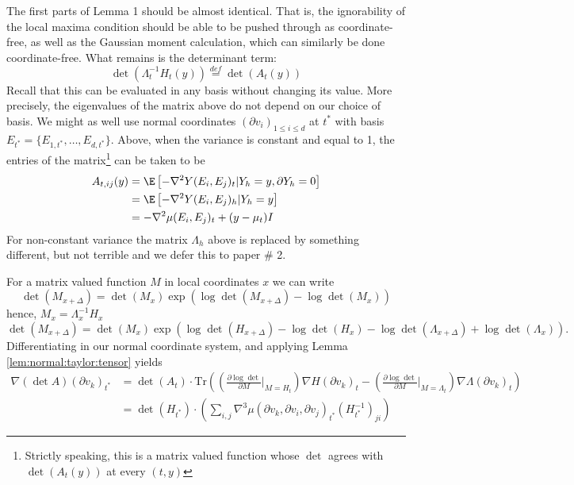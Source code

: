 \documentclass{article}
\begin{document}
The first parts of Lemma 1 should be almost identical. That is, the ignorability
of the local maxima condition should be able to be pushed through as coordinate-free,
as well as the Gaussian moment calculation, which can similarly be done coordinate-free. What remains is the determinant term:
$$
\det(\Lambda_t^{-1} H_t(y)) \overset{def}{=} \det(A_t(y))
$$
Recall that this can be evaluated in any basis without changing its value. More precisely, the eigenvalues
of the matrix above do not depend on our choice of basis.
We might as well use normal coordinates $(\partial v_i)_{1 \leq i \leq d}$ at $t^*$ with basis $E_{t^*}=\{E_{1,t^*}, \dots, E_{d,t^*}\}$.
Above, when the variance is constant and equal to 1, the entries of the matrix\footnote{Strictly speaking, this is a matrix valued function whose $\det$ agrees with $\det(A_t(y))$ at every $(t,y)$} can be taken to be
$$
\begin{aligned}
A_{t,ij}(y) &= \E \left[-\nabla^2 Y(E_i, E_j)_t | Y_h=y, \partial Y_h=0\right] \\
&= \E \left[-\nabla^2 Y(E_i, E_j)_h | Y_h=y\right] \\
&= - \nabla^2 \mu(E_i, E_j)_t + (y - \mu_t) I \\
\end{aligned}
$$
For non-constant variance the matrix $\Lambda_h$ above is replaced by something different, but not terrible and we defer this to paper \# 2.

For a matrix valued function $M$ in local coordinates $x$ we can write
$$
\det(M_{x+\Delta}) = \det(M_{x}) \exp(\log \det(M_{x+\Delta}) - \log \det( M_{x}))
$$
hence, $M_x = \Lambda_x^{-1}H_x$
$$
\det(M_{x+\Delta}) = \det(M_{x}) \exp(\log \det(H_{x+\Delta}) - \log \det( H_{x}) - \log \det(\Lambda_{x+\Delta}) + \log \det(\Lambda_x)).
$$
Differentiating in our normal coordinate system, and applying Lemma \ref{lem:normal:taylor:tensor} yields
$$
\begin{aligned}
  \nabla (\det A)(\partial v_k)_{t^*} &= \det(A_{t}) \cdot \text{Tr}\left(\left(\frac{\partial \log \det}{\partial M}\biggl|_{M=H_t}\right) \nabla H(\partial v_k)_t - \left(\frac{\partial \log \det}{\partial M}\biggl|_{M=\Lambda_t}\right) \nabla \Lambda(\partial v_k)_t\right) \\
  &= \det(H_{t^*}) \cdot \left(\sum_{i,j} \nabla^3 \mu(\partial v_k, \partial v_i, \partial v_j)_{t^*} (H_{t^*}^{-1})_{ji} \right)
\end{aligned}
$$
\end{document}
